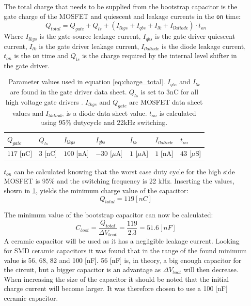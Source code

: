 The total charge that needs to be supplied from the bootstrap capacitor is the gate charge of the MOSFET and quiescent and leakage currents in the \texttt{on} time:
\begin{equation}
	Q_{total} = Q_{gate} + Q_{ls} + (I_{lkgs} + I_{qbs} + I_{lk} + I_{lkdiode}) \cdot t_{on}
	\label{eq:charge_total}
\end{equation}
Where $I_{lkgs}$ is the gate-source leakage current, $I_{qbs}$ is the gate driver quiescent current, $I_{lk}$ is the gate driver leakage current, $I_{lkdiode}$ is the diode leakage current, $ t_{on}$ is the \texttt{on} time and $Q_{ls}$ is the charge required by the internal level shifter in the gate driver.
\begin{table}[h]
\centering
\begin{tabular}{|l|l|l|l|l|l|l|}
 \hline
 $Q_{gate}$ 	& $Q_{ls}$ 	& $I_{lkgs}$ 	& $I_{qbs}$ 		& $I_{lk}$ 			& $I_{lkdiode}$ 	& $t_{on}$ 		\\ 	\hline
 $117$ [nC]		& $3$ [nC]	& $100$ [nA]	&$-30$ [$\mu$A]		& $1$ [$\mu$A]		& $1$ [nA]			& $43$ [$\mu$S]	\\ 	\hline
\end{tabular}
\caption{Parameter values used in equation \ref{eq:charge_total}. $I_{qbs}$ and $I_{lk}$ are found in the gate driver data sheet. $Q_{ls}$ is set to 3nC for all high voltage gate drivers \cite{bootstrap_ON}. $I_{lkgs}$ and $Q_{gate}$ are MOSFET data sheet values and $I_{lkdiode}$  is a diode data sheet value. $t_{on}$ is calculated using 95\% dutycycle and 22kHz switching.}
\label{tab:bootstrap_parameter}
\end{table}
$t_{on}$ can be calculated knowing that the worst case duty cycle for the high side MOSFET is 95\% and the switching frequency is 22 kHz.
Inserting the values, shown in \ref{tab:bootstrap_parameter}, yields the minimum charge value of the capacitor:
\begin{equation}
	Q_{total} = 119 [nC]
\end{equation}

The minimum value of the bootstrap capacitor can now be calculated:
\begin{equation}
	C_{boot} = \frac{Q_{total}}{\Delta V_{boot}} = \frac{119}{2.3} = 51.6 [nF]
\end{equation}
A ceramic capacitor will be used as it has a negligible leakage current. 
Looking for SMD ceramic capacitors it was found that in the range of the found minimum value is 56, 68, 82 and 100 [nF].
56 [nF] is, in theory, a big enough capacitor for the circuit, but a bigger capacitor is an advantage as $\Delta V_{boot}$ will then decrease.
When increasing the size of the capacitor it should be noted that the initial charge current will become larger.
It was therefore chosen to use a 100 [nF] ceramic capacitor.

